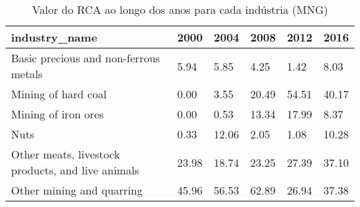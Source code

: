 \begin{table}
\centering
\caption{Valor do RCA ao longo dos anos para cada indústria (MNG)}
\begin{tabular}{p{6cm}p{1.5cm}p{1.5cm}p{1.5cm}p{1.5cm}p{1.5cm}}
\toprule
                                    industry\_name &  2000 &  2004 &  2008 &  2012 &  2016 \\
\midrule
            Basic precious and non-ferrous metals &  5.94 &  5.85 &  4.25 &  1.42 &  8.03 \\
                              Mining of hard coal &  0.00 &  3.55 & 20.49 & 54.51 & 40.17 \\
                              Mining of iron ores &  0.00 &  0.53 & 13.34 & 17.99 &  8.37 \\
                                             Nuts &  0.33 & 12.06 &  2.05 &  1.08 & 10.28 \\
Other meats, livestock products, and live animals & 23.98 & 18.74 & 23.25 & 27.39 & 37.10 \\
                        Other mining and quarring & 45.96 & 56.53 & 62.89 & 26.94 & 37.38 \\
\bottomrule
\end{tabular}
\end{table}
